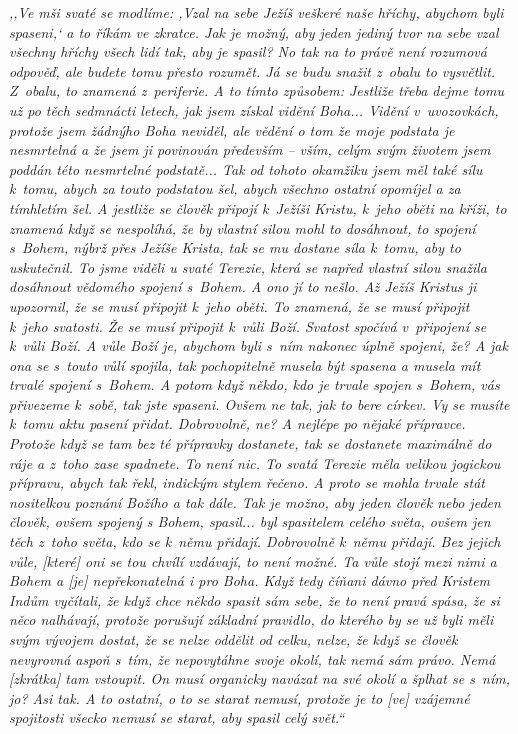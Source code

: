 \textit{%
,,Ve mši svaté se modlíme: ,Vzal na sebe Ježíš veškeré naše hříchy, abychom byli
spaseni,` a to říkám ve zkratce. Jak je možný, aby jeden jediný tvor na sebe
vzal všechny hříchy všech lidí tak, aby je spasil? No tak na to právě není
rozumová odpověď, ale budete tomu přesto rozumět. Já se budu snažit z~obalu to
vysvětlit. Z~obalu, to znamená z~periferie. A to tímto způsobem: Jestliže třeba
dejme tomu už po těch sedmnácti letech, jak jsem získal vidění Boha... Vidění
v~uvozovkách, protože jsem žádnýho Boha neviděl, ale vědění o tom že moje
podstata je nesmrtelná a že jsem ji povinován především -- vším, celým svým
životem jsem poddán této nesmrtelné podstatě... Tak od tohoto okamžiku jsem měl
také sílu k~tomu, abych za touto podstatou šel, abych všechno ostatní opomíjel a
za tímhletím šel. A jestliže se člověk připojí k~Ježíši Kristu, k~jeho oběti na
kříži, to znamená když se nespolíhá, že by vlastní silou mohl to dosáhnout, to
spojení s~Bohem, nýbrž přes Ježíše Krista, tak se mu dostane síla k~tomu, aby to
uskutečnil. To jsme viděli u svaté Terezie, která se napřed vlastní silou
snažila dosáhnout vědomého spojení s~Bohem. A ono jí to nešlo. Až Ježíš Kristus
ji upozornil, že se musí připojit k~jeho oběti. To znamená, že se musí připojit
k~jeho svatosti. Že se musí připojit k~vůli Boží. Svatost spočívá v~připojení se
k~vůli Boží. A vůle Boží je, abychom byli s~ním nakonec úplně spojeni, že? A jak
ona se s~touto vůlí spojila, tak pochopitelně musela být spasena a musela mít
trvalé spojení s~Bohem. A potom když někdo, kdo je trvale spojen s~Bohem, vás
přivezeme k~sobě, tak jste spaseni. Ovšem ne tak, jak to bere církev. Vy se
musíte k~tomu aktu pasení přidat. Dobrovolně, ne? A nejlépe po nějaké přípravce.
Protože když se tam bez té přípravky dostanete, tak se dostanete maximálně do
ráje a z~toho zase spadnete. To není nic. To svatá Terezie měla velikou jogickou
přípravu, abych tak řekl, indickým stylem řečeno. A proto se mohla trvale stát
nositelkou poznání Božího a tak dále. Tak je možno, aby jeden člověk nebo jeden
člověk, ovšem spojený s Bohem, spasil... byl spasitelem celého světa, ovšem jen
těch z~toho světa, kdo se k~němu přidají. Dobrovolně k~němu přidají. Bez jejich
vůle, [které] oni se tou chvílí vzdávají, to není možné. Ta vůle stojí mezi nimi
a Bohem a [je] nepřekonatelná i pro Boha. Když tedy číňani dávno před Kristem
Indům vyčítali, že když chce někdo spasit sám sebe, že to není pravá spása, že
si něco nalhávají, protože porušují základní pravidlo, do kterého by se už byli
měli svým vývojem dostat, že se nelze oddělit od celku, nelze, že když se člověk
nevyrovná aspoň s~tím, že nepovytáhne svoje okolí, tak nemá sám právo. Nemá
[zkrátka] tam vstoupit. On musí organicky navázat na své okolí a šplhat se
s~ním, jo? Asi tak. A to ostatní, o to se starat nemusí, protože je to [ve]
vzájemné spojitosti všecko nemusí se starat, aby spasil celý svět.``
}

